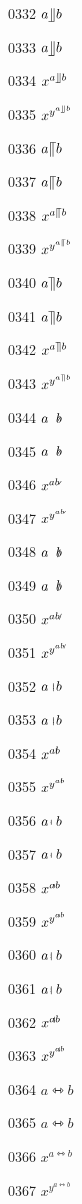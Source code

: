 \documentclass{article}
\begin{document}
0332 $a\rrfloor b$\par
0333 $\displaystyle a\rrfloor b$\par
0334 $x^{a\rrfloor b}$\par
0335 $x^{y^{a\rrfloor b}}$\par
0336 $a\llceil b$\par
0337 $\displaystyle a\llceil b$\par
0338 $x^{a\llceil b}$\par
0339 $x^{y^{a\llceil b}}$\par
0340 $a\rrceil b$\par
0341 $\displaystyle a\rrceil b$\par
0342 $x^{a\rrceil b}$\par
0343 $x^{y^{a\rrceil b}}$\par
0344 $a\arrownot b$\par
0345 $\displaystyle a\arrownot b$\par
0346 $x^{a\arrownot b}$\par
0347 $x^{y^{a\arrownot b}}$\par
0348 $a\Arrownot b$\par
0349 $\displaystyle a\Arrownot b$\par
0350 $x^{a\Arrownot b}$\par
0351 $x^{y^{a\Arrownot b}}$\par
0352 $a\Mapstochar b$\par
0353 $\displaystyle a\Mapstochar b$\par
0354 $x^{a\Mapstochar b}$\par
0355 $x^{y^{a\Mapstochar b}}$\par
0356 $a\mapsfromchar b$\par
0357 $\displaystyle a\mapsfromchar b$\par
0358 $x^{a\mapsfromchar b}$\par
0359 $x^{y^{a\mapsfromchar b}}$\par
0360 $a\Mapsfromchar b$\par
0361 $\displaystyle a\Mapsfromchar b$\par
0362 $x^{a\Mapsfromchar b}$\par
0363 $x^{y^{a\Mapsfromchar b}}$\par
0364 $a\leftrightarrowtriangle b$\par
0365 $\displaystyle a\leftrightarrowtriangle b$\par
0366 $x^{a\leftrightarrowtriangle b}$\par
0367 $x^{y^{a\leftrightarrowtriangle b}}$\par
\end{document}
